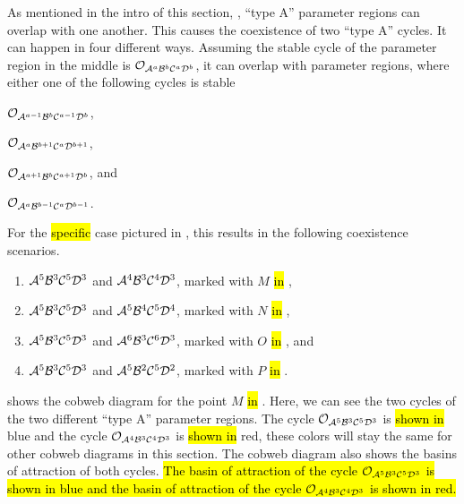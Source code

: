 As mentioned in the intro of this section, , ``type A'' parameter regions can overlap with one another.
This causes the coexistence of two ``type A'' cycles.
It can happen in four different ways.
Assuming the stable cycle of the parameter region in the middle is $\mathcal{O}_{\mathcal{A}^a\mathcal{B}^b\mathcal{C}^a\mathcal{D}^b}$, it can overlap with parameter regions, where either one of the following cycles is stable
\begin{enumerate*}
	\item $\mathcal{O}_{\mathcal{A}^{a-1}\mathcal{B}^b\mathcal{C}^{a-1}\mathcal{D}^b}$,
	\item $\mathcal{O}_{\mathcal{A}^a\mathcal{B}^{b+1}\mathcal{C}^a\mathcal{D}^{b+1}}$,
	\item $\mathcal{O}_{\mathcal{A}^{a+1}\mathcal{B}^b\mathcal{C}^{a+1}\mathcal{D}^b}$, and
	\item $\mathcal{O}_{\mathcal{A}^a\mathcal{B}^{b-1}\mathcal{C}^a\mathcal{D}^{b-1}}$.
\end{enumerate*}
For the \hl{specific} case pictured in , this results in the following coexistence scenarios.
\begin{enumerate}
	\item $\mathcal{A}^5\mathcal{B}^3\mathcal{C}^5\mathcal{D}^3$ and $\mathcal{A}^4\mathcal{B}^3\mathcal{C}^4\mathcal{D}^3$, marked with $M$ \hl{in} ,
	\item $\mathcal{A}^5\mathcal{B}^3\mathcal{C}^5\mathcal{D}^3$ and $\mathcal{A}^5\mathcal{B}^4\mathcal{C}^5\mathcal{D}^4$, marked with $N$ \hl{in} ,
	\item $\mathcal{A}^5\mathcal{B}^3\mathcal{C}^5\mathcal{D}^3$ and $\mathcal{A}^6\mathcal{B}^3\mathcal{C}^6\mathcal{D}^3$, marked with $O$ \hl{in} , and
	\item $\mathcal{A}^5\mathcal{B}^3\mathcal{C}^5\mathcal{D}^3$ and $\mathcal{A}^5\mathcal{B}^2\mathcal{C}^5\mathcal{D}^2$, marked with $P$ \hl{in} .
\end{enumerate}
 shows the cobweb diagram for the point $M$ \hl{in} .
Here, we can see the two cycles of the two different ``type A'' parameter regions.
The cycle $\mathcal{O}_{\mathcal{A}^5\mathcal{B}^3\mathcal{C}^5\mathcal{D}^3}$ is \hl{shown in} blue and the cycle $\mathcal{O}_{\mathcal{A}^4\mathcal{B}^3\mathcal{C}^4\mathcal{D}^3}$ is \hl{shown in} red, these colors will stay the same for other cobweb diagrams in this section.
The cobweb diagram also shows the basins of attraction of both cycles.
\hl{
	The basin of attraction of the cycle $\mathcal{O}_{\mathcal{A}^5\mathcal{B}^3\mathcal{C}^5\mathcal{D}^3}$ is shown in blue and the basin of attraction of the cycle $\mathcal{O}_{\mathcal{A}^4\mathcal{B}^3\mathcal{C}^4\mathcal{D}^3}$ is shown in red.
}

